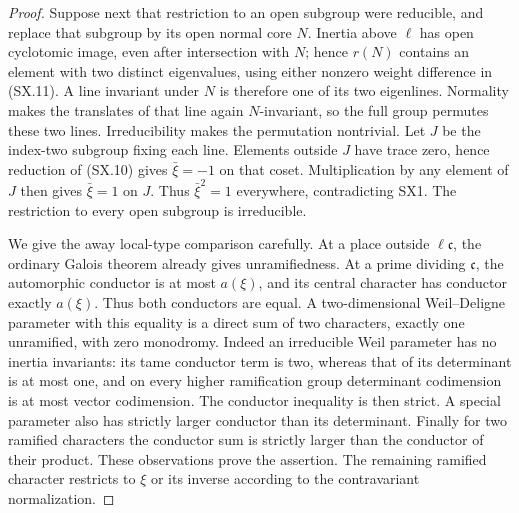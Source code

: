\begin{proof}
Suppose next that restriction to an open subgroup were reducible,
and replace that subgroup by its open normal core $N$.
Inertia above $\ell$ has open cyclotomic image, even after
intersection with $N$; hence $r(N)$ contains an element with two
distinct eigenvalues, using either nonzero weight difference in
(SX.11).  A line invariant under $N$ is therefore one of its two
eigenlines.  Normality makes the translates of that line again
$N$-invariant, so the full group permutes these two lines.
Irreducibility makes the permutation nontrivial.
Let $J$ be the index-two subgroup fixing each line.  Elements
outside $J$ have trace zero, hence reduction of (SX.10) gives
$\bar\xi=-1$ on that coset.  Multiplication by any element of
$J$ then gives $\bar\xi=1$ on $J$.  Thus $\bar\xi^2=1$
everywhere, contradicting SX1.  The restriction to every open
subgroup is irreducible.

We give the away local-type comparison carefully.  At a place
outside $\ell\mathfrak c$, the ordinary Galois theorem already
gives unramifiedness.  At a prime dividing $\mathfrak c$, the
automorphic conductor is at most $a(\xi)$, and its central
character has conductor exactly $a(\xi)$.  Thus both conductors
are equal.  A two-dimensional Weil--Deligne parameter with this
equality is a direct sum of two characters, exactly one
unramified, with zero monodromy.  Indeed an irreducible Weil
parameter has no inertia invariants: its tame conductor term is
two, whereas that of its determinant is at most one, and on
every higher ramification group determinant codimension is at
most vector codimension.  The conductor inequality is then
strict.  A special parameter also has strictly larger conductor
than its determinant.  Finally for two ramified characters the
conductor sum is strictly larger than the conductor of their
product.  These observations prove the assertion.  The remaining
ramified character restricts to $\xi$ or its inverse according
to the contravariant normalization.


\end{proof}
